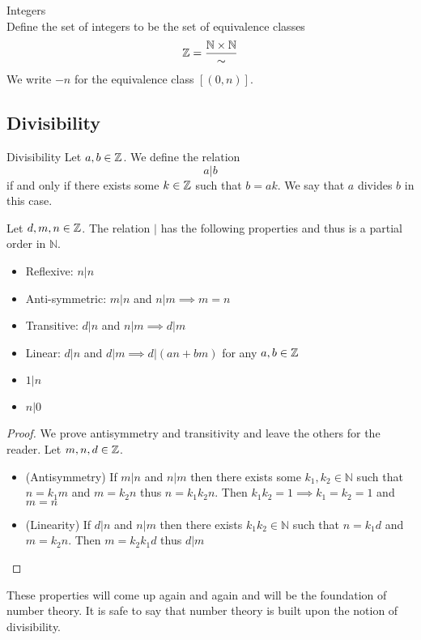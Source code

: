 \documentclass[a4paper]{article}
\begin{document}
\begin{defn}{Integers}{}\\
Define the set of integers to be the set of equivalence classes $$\mathbb{Z}=\frac{\mathbb{N}\times\mathbb{N}}{\sim}$$ We write $-n$ for the equivalence class $[(0,n)]$. 
\end{defn}

\subsection{Divisibility}
\begin{defn}{Divisibility}{} Let $a,b\in\mathbb{Z}$. We define the relation $$a|b$$ if and only if there exists some $k\in\mathbb{Z}$ such that $b=ak$. We say that $a$ divides $b$ in this case. 
\end{defn}

\begin{prp}{}{} Let $d,m,n\in\mathbb{Z}$. The relation $|$ has the following properties and thus is a partial order in $\mathbb{N}$. 
\begin{itemize}
\item Reflexive: $n|n$
\item Anti-symmetric: $m|n$ and $n|m\implies m=n$
\item Transitive: $d|n$ and $n|m\implies d|m$
\item Linear: $d|n$ and $d|m\implies d|(an+bm)$ for any $a,b\in\mathbb{Z}$
\item $1|n$
\item $n|0$
\end{itemize} 
\begin{proof} We prove antisymmetry and transitivity and leave the others for the reader. Let $m,n,d\in\mathbb{Z}$. 
\begin{itemize}
\item (Antisymmetry) If $m|n$ and $n|m$ then there exists some $k_1,k_2\in\mathbb{N}$ such that $n=k_1m$ and $m=k_2n$ thus $n=k_1k_2n$. Then $k_1k_2=1\implies k_1=k_2=1$ and $m=n$
\item (Linearity) If $d|n$ and $n|m$ then there exists $k_1k_2\in\mathbb{N}$ such that $n=k_1d$ and $m=k_2n$. Then $m=k_2k_1d$ thus $d|m$
\end{itemize}
\end{proof}
\end{prp}

These properties will come up again and again and will be the foundation of number theory. It is safe to say that number theory is built upon the notion of divisibility. 
\end{document}
